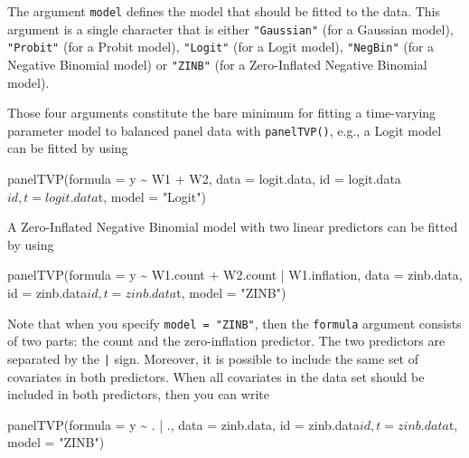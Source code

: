 \documentclass[a4paper, preprint, 3p,
authoryear]{elsarticle} %
\newenvironment{Shaded}{\begin{snugshade}}{\end{snugshade}}
\newcommand{\NormalTok}[1]{#1}
\begin{document}
The argument \texttt{model} defines the model that should be fitted to
the data. This argument is a single character that is either
\texttt{"Gaussian"} (for a Gaussian model), \texttt{"Probit"} (for a
Probit model), \texttt{"Logit"} (for a Logit model), \texttt{"NegBin"}
(for a Negative Binomial model) or \texttt{"ZINB"} (for a Zero-Inflated
Negative Binomial model).

Those four arguments constitute the bare minimum for fitting a
time-varying parameter model to balanced panel data with
\texttt{panelTVP()}, e.g., a Logit model can be fitted by using

\begin{Shaded}
\begin{Highlighting}[]
\NormalTok{panelTVP(formula = y \textasciitilde{} W1 + W2,}
\NormalTok{         data = logit.data,}
\NormalTok{         id = logit.data$id,}
\NormalTok{         t = logit.data$t,}
\NormalTok{         model = "Logit")}
\end{Highlighting}
\end{Shaded}

A Zero-Inflated Negative Binomial model with two linear predictors can
be fitted by using

\begin{Shaded}
\begin{Highlighting}[]
\NormalTok{panelTVP(formula = y \textasciitilde{} W1.count + W2.count | W1.inflation,}
\NormalTok{         data = zinb.data,}
\NormalTok{         id = zinb.data$id,}
\NormalTok{         t = zinb.data$t,}
\NormalTok{         model = "ZINB")}
\end{Highlighting}
\end{Shaded}

Note that when you specify \texttt{model = "ZINB"}, then the
\texttt{formula} argument consists of two parts: the count and the
zero-inflation predictor. The two predictors are separated by the
\texttt{|} sign. Moreover, it is possible to include the same set of
covariates in both predictors. When all covariates in the data set
should be included in both predictors, then you can write

\begin{Shaded}
\begin{Highlighting}[]
\NormalTok{panelTVP(formula = y \textasciitilde{} . | .,}
\NormalTok{         data = zinb.data,}
\NormalTok{         id = zinb.data$id,}
\NormalTok{         t = zinb.data$t,}
\NormalTok{         model = "ZINB")}
\end{Highlighting}
\end{Shaded}
\end{document}
